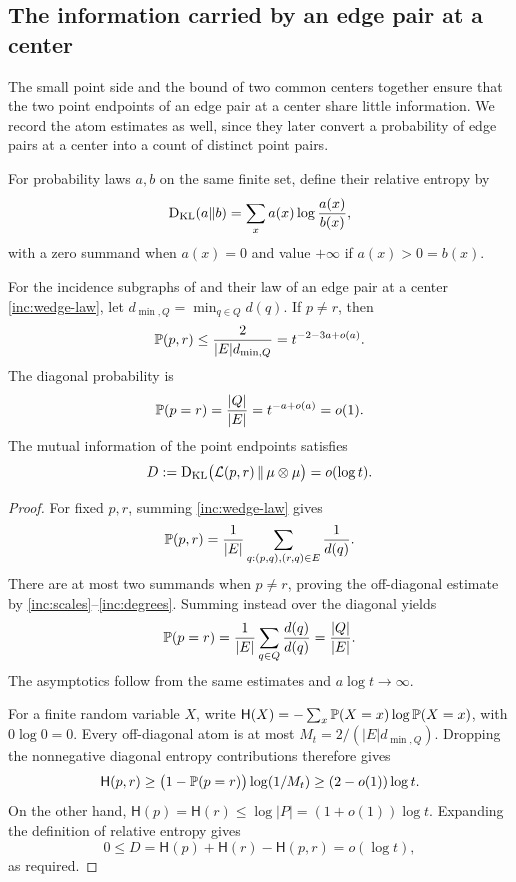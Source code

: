 \subsection{The information carried by an edge pair at a center}

The small point side and the bound of two common centers together ensure
that the two point endpoints of an edge pair at a center share little information. We
record the atom estimates as well, since they later convert a probability
of edge pairs at a center into a count of distinct point pairs.

For probability laws \(a,b\) on the same finite set, define their relative
entropy by
\begin{equation}\label{inc:relative-entropy}
 \operatorname{D_{\mathrm{KL}}}(a\Vert b)=\sum_x a(x)\log\frac{a(x)}{b(x)},
\end{equation}
with a zero summand when \(a(x)=0\) and value \(+\infty\) if
\(a(x)>0=b(x)\).

\begin{lemma}\label{inc:entropy}
For the incidence subgraphs of  and their law of an edge pair at a center
\eqref{inc:wedge-law}, let
\(d_{\min,Q}=\min_{q\in Q}d(q)\). If \(p\ne r\), then
\begin{equation}\label{inc:wedge-atoms}
 \mathbb P(p,r)\le\frac{2}{|E|d_{\min,Q}}
                 =t^{-2-3a+o(a)}.
\end{equation}
The diagonal probability is
\begin{equation}\label{inc:wedge-diagonal}
 \mathbb P(p=r)=\frac{|Q|}{|E|}=t^{-a+o(a)}=o(1).
\end{equation}
The mutual information of the point endpoints satisfies
\begin{equation}\label{inc:information-bound}
 D:=\operatorname{D_{\mathrm{KL}}}\bigl(\mathcal L(p,r)\,\Vert\,\mu\otimes\mu\bigr)
   =o(\log t).
\end{equation}
\end{lemma}

\begin{proof}
For fixed \(p,r\), summing \eqref{inc:wedge-law} gives
\[
 \mathbb P(p,r)=\frac1{|E|}
       \sum_{q:(p,q),(r,q)\in E}\frac1{d(q)}.
\]
There are at most two summands when \(p\ne r\), proving the
off-diagonal estimate by \eqref{inc:scales}--\eqref{inc:degrees}.
Summing instead over the diagonal yields
\[
 \mathbb P(p=r)=\frac1{|E|}\sum_{q\in Q}
                 \frac{d(q)}{d(q)}=\frac{|Q|}{|E|}.
\]
The asymptotics follow from the same estimates and
\(a\log t\to\infty\).

For a finite random variable \(X\), write
\(\mathsf H(X)=-\sum_x\mathbb P(X=x)\log\mathbb P(X=x)\), with
\(0\log0=0\). Every off-diagonal atom is at most
\(M_t=2/(|E|d_{\min,Q})\). Dropping the nonnegative diagonal
entropy contributions therefore gives
\[
 \mathsf H(p,r)
 \ge\bigl(1-\mathbb P(p=r)\bigr)\log(1/M_t)
 \ge(2-o(1))\log t.
\]
On the other hand,
\(\mathsf H(p)=\mathsf H(r)\le\log|P|
=(1+o(1))\log t\). Expanding the definition of relative entropy
gives
\[
 0\le D=\mathsf H(p)+\mathsf H(r)-\mathsf H(p,r)
       =o(\log t),
\]
as required.
\end{proof}

